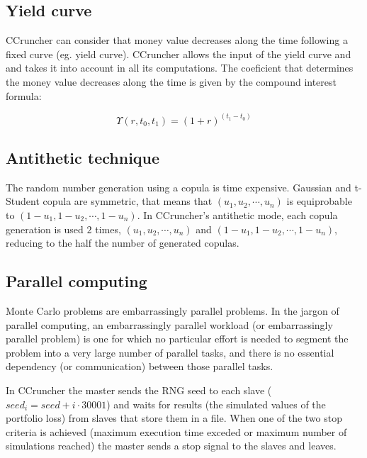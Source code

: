 \documentclass[a4paper,12pt,final]{article}
\begin{document}
\subsection{Yield curve}
CCruncher can consider that money value decreases along the time following a fixed 
curve (eg. yield curve). CCruncher allows the input of the yield curve and and takes
it into account in all its computations. The coeficient that determines the money 
value decreases along the time is given by the compound interest formula:

\begin{displaymath}
\Upsilon(r, t_0,t_1) = (1+r)^{(t_1-t_0)}
\end{displaymath}

\subsection{Antithetic technique}
The random number generation using a copula is time expensive. Gaussian and 
t-Student copula are symmetric, that means that $(u_1, u_2, \cdots, u_n)$ is 
equiprobable to $(1-u_1, 1-u_2, \cdots, 1-u_n)$. In CCruncher's antithetic mode, 
each copula generation is used $2$ times, $(u_1, u_2, \cdots, u_n)$ and 
$(1-u_1, 1-u_2, \cdots, 1-u_n)$, reducing to the half the number of generated
copulas.

\subsection{Parallel computing}
Monte Carlo problems are embarrassingly parallel problems.
In the jargon of parallel computing, an embarrassingly parallel workload 
(or embarrassingly parallel problem) is one for which no particular effort 
is needed to segment the problem into a very large number of parallel tasks, 
and there is no essential dependency (or communication) between those parallel 
tasks.
\newline

In CCruncher the master sends the RNG seed to each slave 
($seed_i = seed + i \cdot 30001$) and waits for results (the simulated values of
the portfolio loss) from slaves that store them in a file. When one of the two stop 
criteria is achieved (maximum execution time exceded or maximum number of 
simulations reached) the master sends a stop signal to the slaves and leaves.
\end{document}
